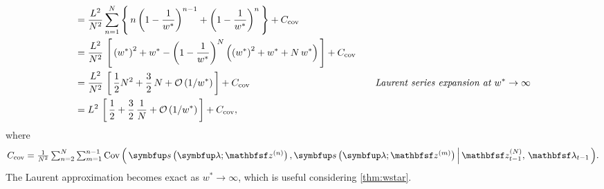 \begin{proofEnd}
\begin{alignat}{2}
    &\quad=
    \frac{L^2}{N^2}\sum^{N}_{n=1}
    \left\{\,
      n \, {\left(1 - \frac{1}{w^*}\right)}^{n-1}
      +
      {\left(1 - \frac{1}{w^*}\right)}^{n} 
      \,\right\}
      +
    C_{\text{cov}}
    \nonumber
    \\
    &\quad=
    \frac{L^2}{N^2} \,
    \left[\,
      {\left(w^*\right)}^2 + w^*
      -
      {\left(1 - \frac{1}{w^*}\right)}^N
      \left(
        {\left(w^*\right)}^2 + w^* + N\,w^*
      \right)
    \,\right]
    +
    C_{\text{cov}}
    \nonumber
    \\
    &\quad=
    \frac{L^2}{N^2} \,
    \left[\,
    \frac{1}{2} N^2 + \frac{3}{2}\,N 
    + \mathcal{O}\left(1/w^*\right)
    \,\right]
    +
    C_{\text{cov}}
    \nonumber
    &&\quad\text{\textit{Laurent series expansion at \(w^* \rightarrow \infty\)}}
    \\
    &\quad=
    L^2 \,
    \left[\,
    \frac{1}{2} + \frac{3}{2}\,\frac{1}{N}
    + \mathcal{O}\left(1/w^*\right)
    \,\right] + C_{\text{cov}},
    \nonumber
  \end{alignat}
  where \[
  C_\text{cov} = {\textstyle\frac{1}{N^2} \sum^{N}_{n=2} \sum^{n-1}_{m = 1} \Cov{\vs\left(\vlambda; \rvvz^{(n)}\right), \vs\left(\vlambda; \rvvz^{(m)}\right) \,\middle|\, \rvvz_{t-1}^{(N)},\, \rvvlambda_{t-1} }}.\]
  The Laurent approximation becomes exact as \(w^* \rightarrow \infty\), which is useful considering \cref{thm:wstar}.
\end{proofEnd}

